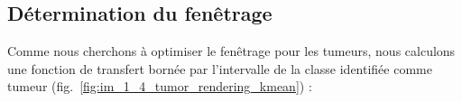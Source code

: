 
				
			\subsection{Détermination du fenêtrage}		
	Comme nous cherchons à optimiser le fenêtrage pour les tumeurs, nous calculons une fonction de transfert bornée par l'intervalle de la classe identifiée comme tumeur (fig.~\ref{fig:im_1_4_tumor_rendering_kmean}) :%


